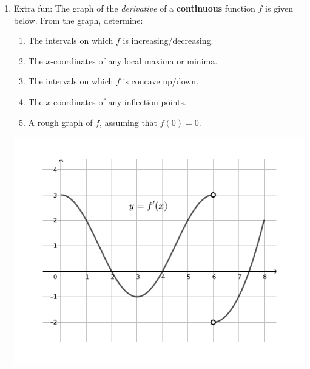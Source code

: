 \documentclass[12pt]{article}
\begin{document}
\begin{enumerate}
\item Extra fun: The graph of the \textit{derivative} of a \textbf{continuous} function $f$ is given below. From the graph, determine:
\begin{multicols}{2}
\begin{enumerate}
\item The intervals on which $f$ is increasing/decreasing.
\item The $x$-coordinates of any local maxima or minima.
\item The intervals on which $f$ is concave up/down.
\item The $x$-coordinates of any inflection points.
\item A rough graph of $f$, assuming that $f(0)=0$.
\end{enumerate}
\begin{center}
\includegraphics[width=\columnwidth]{Tut6-4}
\end{center}
\end{multicols}
  \end{enumerate}
\end{document}
